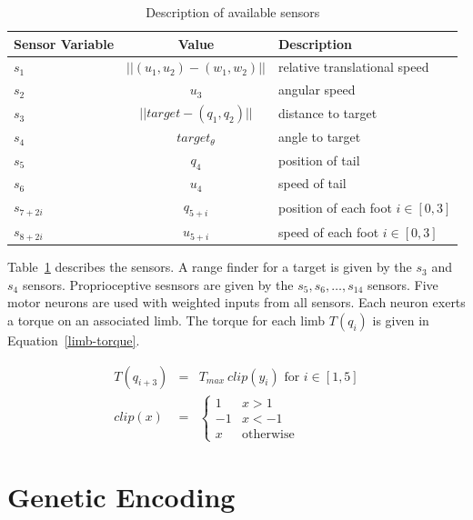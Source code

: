 \begin{table}
  \begin{center}
    \begin{tabular}{ | l | c | l | }
      \hline
      Sensor Variable & Value & Description \\
      \hline
      $s_1$ & $||(u_1, u_2) - (w_1, w_2)||$ & relative translational speed \\
      $s_2$ & $u_3$ & angular speed \\
      $s_3$ & $||target - (q_1, q_2)||$ & distance to target \\ 
      $s_4$ & $target_\theta$ & angle to target \\              
      $s_5$ & $q_4$ & position of tail \\                       
      $s_6$ & $u_4$ & speed of tail \\                          
      $s_{7 + 2 i}$ & $q_{5 + i}$ & position of each foot $i \in [0, 3]$ \\        
      $s_{8 + 2 i}$ & $u_{5 + i}$ & speed of each foot $i \in [0, 3]$ \\           
      \hline
    \end{tabular}
  \end{center}
  \caption[Sensors]{\label{table:sensor}Description of available sensors}
\end{table}

Table~\ref{table:sensor} describes the sensors.  A range finder for a
target is given by the $s_3$ and $s_4$ sensors.  Proprioceptive
sesnsors are given by the $s_5, s_6, \ldots, s_{14}$ sensors.  Five
motor neurons are used with weighted inputs from all sensors.  Each
neuron exerts a torque on an associated limb.  The torque for each
limb $T(q_i)$ is given in Equation~\ref{limb-torque}.

\begin{eqnarray}
  T(q_{i + 3}) &=& T_{max}~clip(y_i) \text{ for } i \in [1,5] \label{limb-torque} \\
  clip(x) &=& \begin{cases}
              1 & x > 1 \\
              -1 & x < -1 \\
              x & \text{otherwise} 
              \end{cases}
\end{eqnarray}

\section{Genetic Encoding}

